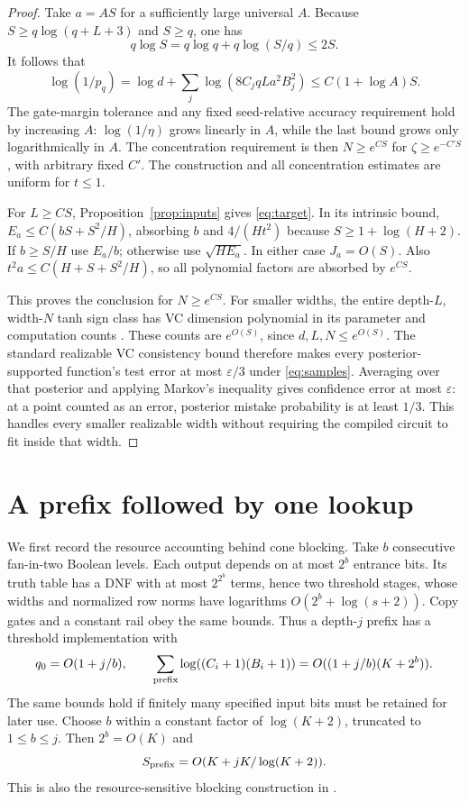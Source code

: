 \documentclass[11pt]{article}
\theoremstyle{remark}\newtheorem{remark}[theorem]{Remark}
\begin{document}
\begin{proof}
Take $a=A S$ for a sufficiently large universal $A$. Because
$S\ge q\log(q+L+3)$ and $S\ge q$, one has
\[
 q\log S=q\log q+q\log(S/q)\le2S.
\]
It follows that
\[
 \log(1/p_q)=\log d+
   \sum_j\log(8C_jqLa^2B_j^2)\le C(1+\log A)S.
\]
The gate-margin tolerance and any fixed seed-relative accuracy
requirement hold by increasing $A$: $\log(1/\eta)$ grows linearly
in $A$, while the last bound grows only logarithmically in $A$.
The concentration requirement is then $N\ge e^{CS}$ for
$\zeta\ge e^{-C'S}$, with arbitrary fixed $C'$. The construction
and all concentration estimates are uniform for $t\le1$.

For $L\ge CS$, Proposition~\ref{prop:inputs} gives
\eqref{eq:target}. In its intrinsic bound, $E_a\le
C(bS+S^2/H)$, absorbing $b$ and $4/(Ht^2)$ because
$S\ge1+\log(H+2)$. If $b\ge S/H$ use $E_a/b$; otherwise use
$\sqrt{HE_a}$. In either case $J_a=O(S)$. Also
$t^2a\le C(H+S+S^2/H)$, so all polynomial factors are absorbed
by $e^{CS}$.

This proves the conclusion for $N\ge e^{CS}$. For smaller widths,
the entire depth-$L$, width-$N$ tanh sign class has VC dimension
polynomial in its parameter and computation counts
\cite{km}. These counts are $e^{O(S)}$, since $d,L,N\le e^{O(S)}$.
The standard realizable VC consistency bound therefore makes every
posterior-supported function's test error at most $\varepsilon/3$
under \eqref{eq:samples}. Averaging over that posterior and applying
Markov's inequality gives confidence error at most $\varepsilon$:
at a point counted as an error, posterior mistake probability is at
least $1/3$. This handles every smaller realizable width without
requiring the compiled circuit to fit inside that width.
\end{proof}

\section{A prefix followed by one lookup}
We first record the resource accounting behind cone blocking.
Take $b$ consecutive fan-in-two Boolean levels. Each output depends
on at most $2^b$ entrance bits. Its truth table has a DNF with at
most $2^{2^b}$ terms, hence two threshold stages, whose widths and
normalized row norms have logarithms $O(2^b+\log(s+2))$.
Copy gates and a constant rail obey the same bounds.
Thus a depth-$j$ prefix has a threshold implementation with
\[
 q_0=O(1+j/b),\qquad
 \sum_{\rm prefix}\log((C_i+1)(B_i+1))
       =O((1+j/b)(K+2^b)).
\]
The same bounds hold if finitely many specified input bits must be
retained for later use. Choose $b$ within a constant factor of
$\log(K+2)$, truncated to $1\le b\le j$. Then $2^b=O(K)$ and
\begin{equation}\label{eq:prefixbudget}
 S_{\rm prefix}=O(K+jK/\log(K+2)).
\end{equation}
This is also the resource-sensitive blocking construction in
\cite[\texttt{thm:critical-boolean-blocking}]{critical}.
\end{document}
